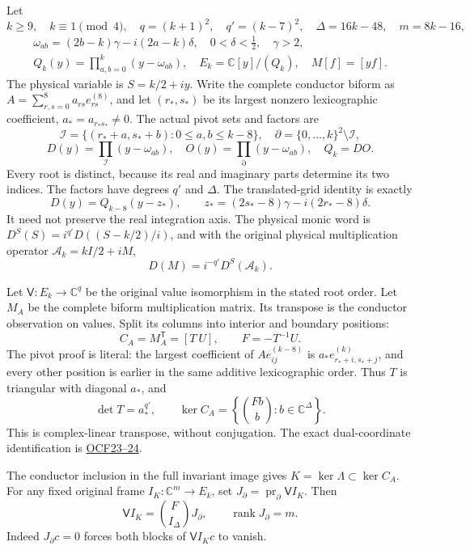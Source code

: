 \documentclass[11pt]{article}
\begin{document}
Let \[
k\ge9,\quad k\equiv1\pmod4,\quad q=(k+1)^2,\quad
q'=(k-7)^2,\quad \Delta=16k-48,\quad m=8k-16,
\] \[
\begin{gathered}\omega_{ab}=(2b-k)\gamma-i(2a-k)\delta,\quad
0<\delta<\tfrac12,\quad\gamma>2,\\
Q_k(y)=\prod_{a,b=0}^k(y-\omega_{ab}),\quad
E_k=\mathbb C[y]/(Q_k),\quad M[f]=[yf].\end{gathered}
\tag{IC1}
\] The physical variable is \(S=k/2+iy\). Write the complete conductor biform as \(A=\sum_{r,s=0}^{8}a_{rs}e_{rs}^{(8)}\), and let \((r_*,s_*)\) be its largest nonzero lexicographic coefficient, \(a_*=a_{r_*s_*}\ne0\). The actual pivot sets and factors are \[
\mathcal I=\{(r_*+a,s_*+b):0\le a,b\le k-8\},\quad
\partial=\{0,\ldots,k\}^2\setminus\mathcal I,
\] \[
D(y)=\prod_{\mathcal I}(y-\omega_{ab}),\quad
O(y)=\prod_{\partial}(y-\omega_{ab}),\quad Q_k=DO.
\tag{IC2}
\] Every root is distinct, because its real and imaginary parts determine its two indices. The factors have degrees \(q'\) and \(\Delta\). The translated-grid identity is exactly \[
D(y)=Q_{k-8}(y-z_*),\qquad
z_*=(2s_*-8)\gamma-i(2r_*-8)\delta.
\] It need not preserve the real integration axis. The physical monic word is \(D^S(S)=i^{q'}D((S-k/2)/i)\), and with the original physical multiplication operator \(\mathscr A_k=kI/2+iM\), \[
D(M)=i^{-q'}D^S(\mathscr A_k).
\tag{IC3}
\]

Let \(\mathsf V:E_k\to\mathbb C^{q}\) be the original value isomorphism in the stated root order. Let \(M_A\) be the complete biform multiplication matrix. Its transpose is the conductor observation on values. Split its columns into interior and boundary positions: \[
C_A=M_A^{\mathsf T}=[T\ U],\qquad F=-T^{-1}U.
\] The pivot proof is literal: the largest coefficient of \(Ae_{ij}^{(k-8)}\) is \(a_*e_{r_*+i,s_*+j}^{(k)}\), and every other position is earlier in the same additive lexicographic order. Thus \(T\) is triangular with diagonal \(a_*\), and \[
\det T=a_*^{q'},\qquad
\ker C_A=\left\{\binom{Fb}{b}:b\in\mathbb C^\Delta\right\}.
\tag{IC4}
\] This is complex-linear transpose, without conjugation. The exact dual-coordinate identification is \href{https://github.com/KokunoYumeto/zeta-function-research-reader/blob/5992ad50c0f2a06921f1fcaded7b4e38097c0739/workbenches/splitzero-tandem/continuations/20260920-original-kernel-mixed-determinants/providers/ORIGINAL_CONDUCTOR_STRIP_FRAME.tex}{OCF23--24}.

The conductor inclusion in the full invariant image gives \(K=\ker\Lambda\subset\ker C_A\). For any fixed original frame \(I_K:\mathbb C^m\to E_k\), set \(J_\partial=\operatorname{pr}_\partial\mathsf V I_K\). Then \[
\mathsf V I_K=\binom F{I_\Delta}J_\partial,\qquad
\operatorname{rank}J_\partial=m.
\tag{IC5}
\] Indeed \(J_\partial c=0\) forces both blocks of \(\mathsf V I_Kc\) to vanish.
\end{document}
